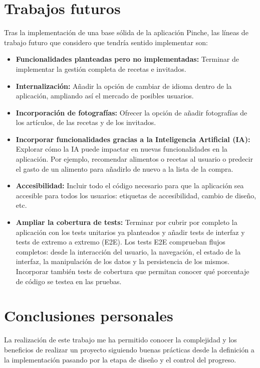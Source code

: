 \section{Trabajos futuros}
\label{sec:trabajos-futuros}

Tras la implementación de una base sólida de la aplicación Pinche, las líneas de trabajo futuro que considero que tendría sentido implementar son:

\begin{itemize}
    \item \textbf{Funcionalidades planteadas pero no implementadas:} Terminar de implementar la gestión completa de recetas e invitados.
    \item \textbf{Internalización:} Añadir la opción de cambiar de idioma dentro de la aplicación, ampliando así el mercado de posibles usuarios.
    \item \textbf{Incorporación de fotografías:} Ofrecer la opción de añadir fotografías de los artículos, de las recetas y de los invitados.
    \item \textbf{Incorporar funcionalidades gracias a la Inteligencia Artificial (IA):} Explorar cómo la IA puede impactar en nuevas funcionalidades en la aplicación. Por ejemplo, recomendar alimentos o recetas al usuario o predecir el gasto de un alimento para añadirlo de nuevo a la lista de la compra.
    \item \textbf{Accesibilidad:} Incluir todo el código necesario para que la aplicación sea accesible para todos los usuarios: etiquetas de accesibilidad, cambio de diseño, etc.
    \item \textbf{Ampliar la cobertura de tests:} Terminar por cubrir por completo la aplicación con los tests unitarios ya planteados y añadir tests de interfaz y tests de extremo a extremo (E2E). Los tests E2E comprueban flujos completos: desde la interacción del usuario, la navegación, el estado de la interfaz, la manipulación de los datos y la persistencia de los mismos. Incorporar también tests de cobertura que permitan conocer qué porcentaje de código se testea en las pruebas.
\end{itemize}

\section{Conclusiones personales}
\label{sec:conclusiones-personales}

La realización de este trabajo me ha permitido conocer la complejidad y los beneficios de realizar un proyecto siguiendo buenas prácticas desde la definición a la implementación pasando por la etapa de diseño y el control del progreso.

